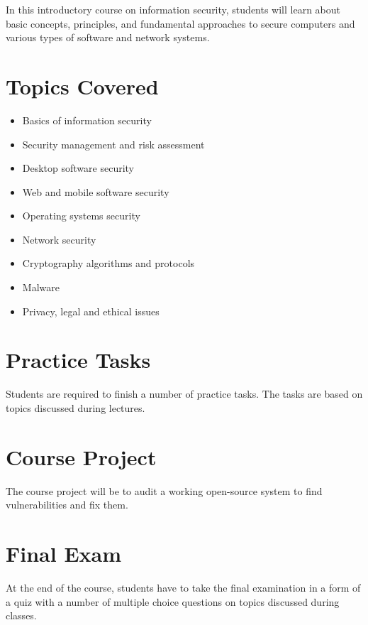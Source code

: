 \documentclass[12pt,a4paper,oneside]{article}
\begin{document}
	In this introductory course on information security, students will learn about basic concepts, principles, and fundamental approaches to secure computers and various types of software and network systems.

    \section{Topics Covered}

        \begin{itemize}
            \item Basics of information security
            \item Security management and risk assessment
            \item Desktop software security
            \item Web and mobile software security
            \item Operating systems security
            \item Network security
            \item Cryptography algorithms and protocols 
            \item Malware
            \item Privacy, legal and ethical issues
        \end{itemize}

    \section{Practice Tasks}

        Students are required to finish a number of practice tasks. The tasks are based
        on topics discussed during lectures.

    \section{Course Project}

        The course project will be to audit a working open-source system to find vulnerabilities and fix them.

    \section{Final Exam}

        At the end of the course, students have to take the final examination in
        a form of a quiz with a number of multiple choice questions on topics
        discussed during classes.
\end{document}
